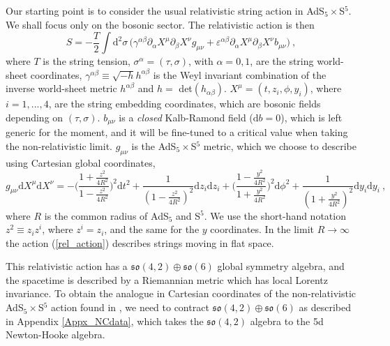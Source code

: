 \documentclass[12pt]{article}
\def\dd{\text{d}}
\numberwithin{equation}{section}
\begin{document}
Our starting point is to consider the usual relativistic string action in AdS$_5\times$S$^5$.  We shall focus only on the bosonic sector. The relativistic action is then 
\begin{equation}
\label{rel_action}
S = - \frac{T}{2} \int \dd^2 \sigma \,  \bigg(\gamma^{\alpha\beta} \partial_{\alpha} X^{\mu} \partial_{\beta} X^{\nu} g_{\mu\nu} + \varepsilon^{\alpha\beta}  \partial_{\alpha} X^{\mu} \partial_{\beta} X^{\nu} b_{\mu\nu} \bigg) \ , 
\end{equation}
where $T$ is the string tension, $\sigma^{\alpha} = (\tau, \sigma)$, with $\alpha = 0, 1$, are the string world-sheet coordinates, $\gamma^{\alpha\beta} \equiv \sqrt{-h} h^{\alpha\beta}$ is the Weyl invariant combination of the inverse world-sheet metric $h^{\alpha\beta}$ and $h =$ det$(h_{\alpha\beta})$.  $X^{\mu} = (t, z_i, \phi, y_i)$, where $i=1,..., 4$, are the string embedding coordinates, which are bosonic fields depending on $(\tau, \sigma)$.  $b_{\mu\nu}$ is a \emph{closed} Kalb-Ramond field ($\dd b = 0$), which is left generic for the moment, and it will be fine-tuned to a critical value when taking the non-relativistic limit.  $g_{\mu\nu}$ is the AdS$_5\times$S$^5$ metric, which we choose to describe using Cartesian global coordinates,
\begin{equation}
\label{metric_cartesian}
g_{\mu\nu} \dd X^{\mu} \dd X^{\nu} = - \bigg(\frac{1+ \frac{z^2}{4 R^2}}{1-\frac{z^2}{4 R^2}}\bigg)^2 \dd t^2 + \frac{1}{(1-\frac{z^2}{4 R^2})^2} \dd z_i \dd z_i + \bigg(\frac{1 - \frac{y^2}{4 R^2}}{1 + \frac{y^2}{4 R^2}}\bigg)^2\dd \phi^2 + \frac{1}{(1+\frac{y^2}{4 R^2})^2} \dd y_i \dd y_i \ ,
\end{equation}
where $R$ is the common radius of AdS$_5$ and S$^5$. We use the short-hand notation $z^2\equiv z_i z^i$, where $z^i = z_i$, and the same for the $y$ coordinates.  In the limit $R \rightarrow \infty$ the action (\ref{rel_action}) describes strings moving in flat space. 

This relativistic action has a $\mathfrak{so}(4,2) \oplus \mathfrak{so}(6)$ global symmetry algebra, and the spacetime is described by a Riemannian metric which has local Lorentz invariance.  
To obtain the analogue in Cartesian coordinates of the non-relativistic AdS$_5\times$S$^5$ action found in \cite{Gomis:2005pg},  we need to contract $\mathfrak{so}(4,2) \oplus \mathfrak{so}(6)$ as described in Appendix \ref{Appx_NCdata}, which takes the $\mathfrak{so}(4,2)$ algebra to the 5d Newton-Hooke algebra.  
\end{document}
